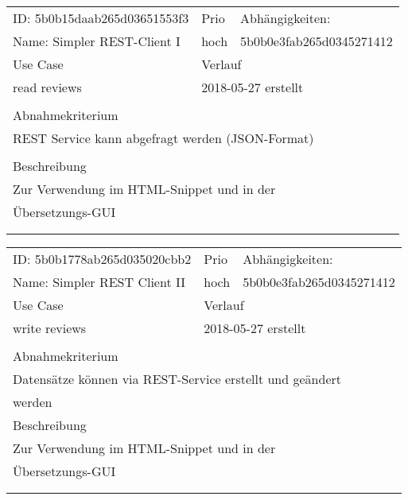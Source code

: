 \documentclass{article}
\begin{document}
\resizebox{10cm}{!} {
\begin{tabular}{lllll}
  \hline
  \multicolumn{2}{|l|}{\tiny{ID: 5b0b15daab265d03651553f3}} & Prio & \multicolumn{2}{|l|}{Abhängigkeiten:} \\
  \multicolumn{2}{|l|}{Name: Simpler REST-Client I} & hoch & \multicolumn{2}{|l|}{\tiny{5b0b0e3fab265d0345271412}} \\
  \hline
  \multicolumn{2}{|l|}{Use Case} & \multicolumn{3}{|l|}{Verlauf} \\
  \multicolumn{2}{|l|}{read reviews} & \multicolumn{3}{|l|}{2018-05-27 erstellt} \\
  \multicolumn{2}{|l|}{} & \multicolumn{3}{|l|}{} \\
  \hline
  \multicolumn{5}{|l|}{Abnahmekriterium} \\
  \multicolumn{5}{|l|}{REST Service kann abgefragt werden (JSON-Format)} \\
  \multicolumn{5}{|l|}{} \\
  \hline
  \multicolumn{5}{|l|}{Beschreibung} \\
  \multicolumn{5}{|l|}{Zur Verwendung im HTML-Snippet und in der} \\
  \multicolumn{5}{|l|}{Übersetzungs-GUI} \\
  \multicolumn{5}{|l|}{} \\
  \multicolumn{5}{|l|}{} \\
  \hline
\end{tabular}
}
\vfill
\resizebox{10cm}{!} {
\begin{tabular}{lllll}
  \hline
  \multicolumn{2}{|l|}{\tiny{ID: 5b0b1778ab265d035020cbb2}} & Prio & \multicolumn{2}{|l|}{Abhängigkeiten:} \\
  \multicolumn{2}{|l|}{Name: Simpler REST Client II} & hoch & \multicolumn{2}{|l|}{\tiny{5b0b0e3fab265d0345271412}} \\
  \hline
  \multicolumn{2}{|l|}{Use Case} & \multicolumn{3}{|l|}{Verlauf} \\
  \multicolumn{2}{|l|}{write reviews} & \multicolumn{3}{|l|}{2018-05-27 erstellt} \\
  \multicolumn{2}{|l|}{} & \multicolumn{3}{|l|}{} \\
  \hline
  \multicolumn{5}{|l|}{Abnahmekriterium} \\
  \multicolumn{5}{|l|}{Datensätze können via REST-Service erstellt und geändert} \\
  \multicolumn{5}{|l|}{werden} \\
  \hline
  \multicolumn{5}{|l|}{Beschreibung} \\
  \multicolumn{5}{|l|}{Zur Verwendung im HTML-Snippet und in der} \\
  \multicolumn{5}{|l|}{Übersetzungs-GUI} \\
  \multicolumn{5}{|l|}{} \\
  \multicolumn{5}{|l|}{} \\
  \hline
\end{tabular}
}
\end{document}
